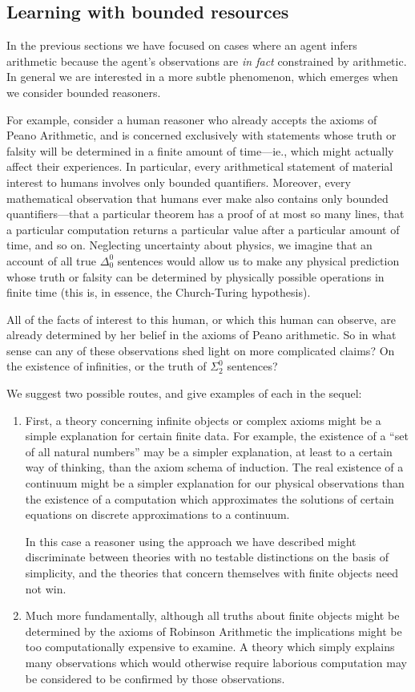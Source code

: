 \documentclass[12pt]{article}
\theoremstyle{definition}
\begin{document}
\subsection{Learning with bounded resources} 

In the previous sections we have focused on cases
where an agent infers arithmetic because
the agent's observations are \emph{in fact} constrained by arithmetic.
In general we are interested in a more subtle phenomenon,
which emerges when we consider bounded reasoners.

For example, consider a human reasoner who already accepts
the axioms of Peano Arithmetic, and is concerned exclusively
with statements whose truth or falsity will be determined
in a finite amount of time---ie., which might actually affect their experiences.
In particular, every arithmetical statement of material interest to humans
involves only bounded quantifiers.
Moreover, every mathematical observation that humans ever make also
contains only bounded quantifiers---that a particular theorem has a proof
of at most so many lines,
that a particular computation returns a particular value after a particular amount of time,
and so on.
Neglecting uncertainty about physics, we imagine that an account of all true
$\Delta^0_0$ sentences would allow us to make any physical prediction
whose truth or falsity can be determined by physically possible operations
in finite time
(this is, in essence, the Church-Turing hypothesis).

All of the facts of interest to this human, or which this human can observe,
are already determined by her belief in the axioms of Peano arithmetic.
So in what sense can any of these observations shed light on more complicated claims?
On the existence of infinities, or the truth of $\Sigma^0_2$ sentences?

We suggest two possible routes, and give examples of each in the sequel:
\begin{enumerate}
\item First, a theory concerning infinite objects or complex axioms
might be a simple explanation for certain finite data.
For example, the existence of a ``set of all natural numbers''
may be a simpler explanation, at least to a certain way of thinking,
than the axiom schema of induction.
The real existence of a continuum might be a simpler
explanation for our physical observations
than the existence of a computation which approximates
the solutions of certain equations on discrete approximations to a continuum.

In this case a reasoner using the approach we have described
might discriminate between theories with no testable distinctions
on the basis of simplicity, and the theories that concern themselves
with finite objects need not win.

\item Much more fundamentally, although all truths about finite
objects might be determined by the axioms of Robinson Arithmetic
the implications might be too computationally expensive to examine.
A theory which simply explains many observations which would otherwise
require laborious computation may be considered to be confirmed
by those observations.
\end{enumerate}
\end{document}
